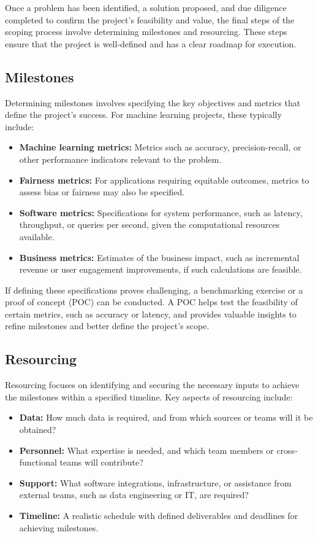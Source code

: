 \documentclass[12pt,openany]{book}
\begin{document}
Once a problem has been identified, a solution proposed, and due diligence completed to confirm the project's feasibility and value, the final steps of the scoping process involve determining milestones and resourcing. These steps ensure that the project is well-defined and has a clear roadmap for execution.

\subsection{Milestones}

Determining milestones involves specifying the key objectives and metrics that define the project's success. For machine learning projects, these typically include:
\begin{itemize}
    \item \textbf{Machine learning metrics:} Metrics such as accuracy, precision-recall, or other performance indicators relevant to the problem.
    \item \textbf{Fairness metrics:} For applications requiring equitable outcomes, metrics to assess bias or fairness may also be specified.
    \item \textbf{Software metrics:} Specifications for system performance, such as latency, throughput, or queries per second, given the computational resources available.
    \item \textbf{Business metrics:} Estimates of the business impact, such as incremental revenue or user engagement improvements, if such calculations are feasible.
\end{itemize}

If defining these specifications proves challenging, a benchmarking exercise or a proof of concept (POC) can be conducted. A POC helps test the feasibility of certain metrics, such as accuracy or latency, and provides valuable insights to refine milestones and better define the project's scope.

\subsection{Resourcing}

Resourcing focuses on identifying and securing the necessary inputs to achieve the milestones within a specified timeline. Key aspects of resourcing include:
\begin{itemize}
    \item \textbf{Data:} How much data is required, and from which sources or teams will it be obtained?
    \item \textbf{Personnel:} What expertise is needed, and which team members or cross-functional teams will contribute?
    \item \textbf{Support:} What software integrations, infrastructure, or assistance from external teams, such as data engineering or IT, are required?
    \item \textbf{Timeline:} A realistic schedule with defined deliverables and deadlines for achieving milestones.
\end{itemize}
\end{document}
